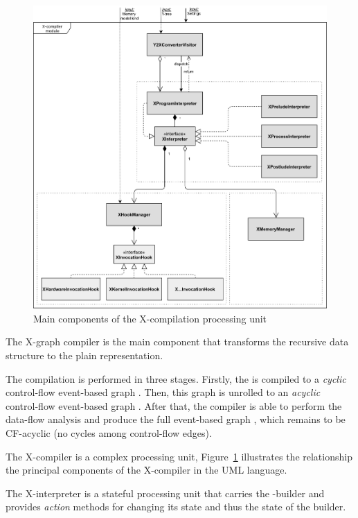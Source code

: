\begin{figure}[th]
    \centering
  \includegraphics[max width=\textwidth,keepaspectratio]{img/my/draw.io/X-compiler.png}
  \caption{Main components of the X-compilation processing unit}
  \label{fig:compiler}
\end{figure}


The X-graph compiler is the main component that transforms the recursive \ytree{} data structure to the plain \xgraph{} representation.

The compilation is performed in three stages.
Firstly, the \ytree{} is compiled to a \textit{cyclic} control-flow event-based graph \xgraph[CF].
Then, this graph is unrolled to an \textit{acyclic} control-flow event-based graph \xgraphU[CF].
After that, the compiler is able to perform the data-flow analysis and produce the full event-based graph \xgraphU[CF+DF], which remains to be CF-acyclic (no cycles among control-flow edges).

The X-compiler is a complex processing unit, Figure~\ref{fig:compiler} illustrates the relationship the principal components of the X-compiler in the UML language.

The X-interpreter is a stateful processing unit that carries the \xgraph{}-builder and provides \textit{action} methods for changing its state and thus the state of the builder.


